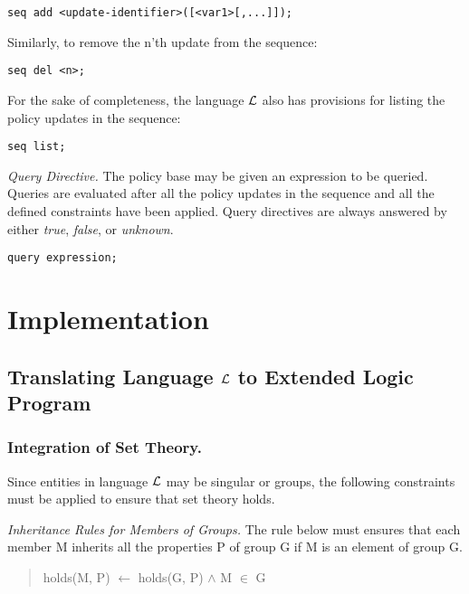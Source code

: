 \documentclass{llncs}
\begin{document}
    \begin{verbatim}seq add <update-identifier>([<var1>[,...]]);\end{verbatim}

    Similarly, to remove the n'th update from the sequence:

    \begin{verbatim}seq del <n>;\end{verbatim}

    For the sake of completeness, the language $\cal{L}$ also has provisions
    for listing the policy updates in the sequence:

    \begin{verbatim}seq list;\end{verbatim}

    \emph{Query Directive.} The policy base may be given an expression to be
    queried. Queries are evaluated after all the policy updates in the
    sequence and all the defined constraints have been applied. Query
    directives are always answered by either \emph{true}, \emph{false}, or
    \emph{unknown}.

    \begin{verbatim}query expression;\end{verbatim}

  \section{Implementation}

    \subsection{Translating Language $\cal{L}$ to Extended Logic Program}

      \subsubsection{Integration of Set Theory.}

        Since entities in language $\cal{L}$ may be singular or groups,
        the following constraints must be applied to ensure that set theory
        holds.

        \emph{Inheritance Rules for Members of Groups.} The rule below must
        ensures that each member M inherits all the properties P of group G if
        M is an element of group G.

        \begin{quote}
          holds(M, P) $\leftarrow$ holds(G, P) $\land$ M $\in$ G
        \end{quote}
\end{document}
